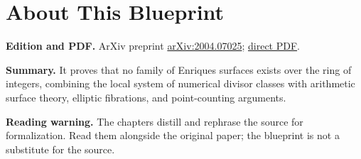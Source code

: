 

\chapter*{About This Blueprint}
\label{no-enriques-surface-over-the-integers-about}


\textbf{Edition and PDF.} ArXiv preprint \href{https://arxiv.org/abs/2004.07025}{arXiv:2004.07025}; \href{https://arxiv.org/pdf/2004.07025}{direct PDF}.

\textbf{Summary.} It proves that no family of Enriques surfaces exists over the ring of integers, combining the local system of numerical divisor classes with arithmetic surface theory, elliptic fibrations, and point-counting arguments.

\textbf{Reading warning.} The chapters distill and rephrase the source for formalization. Read them alongside the original paper; the blueprint is not a substitute for the source.




















